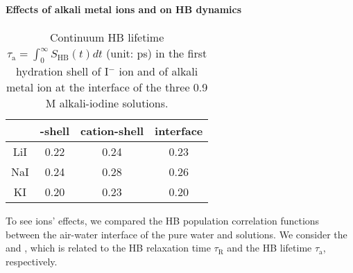 \paragraph{Effects of alkali metal ions and \I on HB dynamics}
\begin{table}[H]
\centering
\caption{\label{tab:tau_hb_alkali_iodine} 
Continuum HB lifetime $\tau_{\text{a}}=\int_0^\infty S_\text{HB}(t) dt$ (unit: ps) in the first hydration shell of I$^-$ ion 
and of alkali metal ion at the interface of the three 0.9 M alkali-iodine solutions.}
\begin{tabular}{cccc}
  &\I-shell &cation-shell& interface \\
\hline
 LiI & 0.22 & 0.24 & 0.23\\
 NaI & 0.24 & 0.28 & 0.26\\
 KI  & 0.20 & 0.23 & 0.20\\
\end{tabular}
\end{table} 

To see ions' effects, we compared the HB population correlation functions between the air-water interface of the pure water and solutions.
We consider the \CHB and \SHB, which is related to the HB relaxation time $\tau_\text{R}$ and the HB lifetime $\tau_\text{a}$, respectively.

